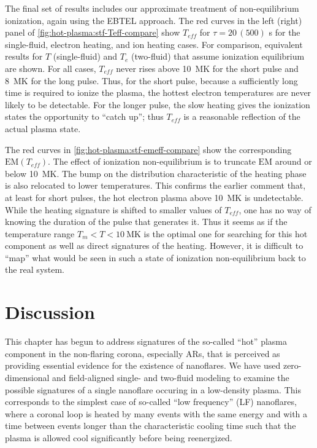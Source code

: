 The final set of results includes our approximate treatment of non-equilibrium ionization, again using the EBTEL approach. The red curves in the left (right) panel of \autoref{fig:hot-plasma:stf-Teff-compare} show $T_{eff}$ for $\tau=20\,(500)$ s for the single-fluid, electron heating, and ion heating cases. For comparison, equivalent results for $T$ (single-fluid) and $T_e$ (two-fluid) that assume ionization equilibrium are shown. For all cases, $T_{eff}$ never rises above \SI{10}{\mega\kelvin} for the short pulse and \SI{8}{\mega\kelvin} for the long pulse. Thus, for the short pulse, because a sufficiently long time is required to ionize the plasma, the hottest electron temperatures are never likely to be detectable. For the longer pulse, the slow heating gives the ionization states the opportunity to ``catch up''; thus $T_{eff}$ is a reasonable reflection of the actual plasma state.

The red curves in \autoref{fig:hot-plasma:stf-emeff-compare} show the corresponding $\mathrm{EM}(T_{eff})$. The effect of ionization non-equilibrium is to truncate  $\mathrm{EM}$ around or below \SI{10}{\mega\kelvin}. The bump on the distribution characteristic of the heating phase is also relocated to lower temperatures. This confirms the earlier comment that, at least for short pulses, the hot electron plasma above \SI{10}{\mega\kelvin} is undetectable. While the heating signature is shifted to smaller values of $T_{eff}$, one has no way of knowing the duration of the pulse that generates it. Thus it seems as if the temperature range $T_m<T<\SI{10}{\mega\kelvin}$ is the optimal one for searching for this hot component as well as direct signatures of the heating. However, it is difficult to ``map'' what would be seen in such a state of ionization non-equilibrium back to the real system.

\section{Discussion}\label{hot-plasma:sec:discussion}

This chapter has begun to address signatures of the so-called ``hot'' plasma component in the non-flaring corona, especially ARs, that is perceived as providing essential evidence for the existence of nanoflares. We have used zero-dimensional and field-aligned single- and two-fluid modeling to examine the possible signatures of a single nanoflare occuring in a low-density plasma. This corresponds to the simplest case of so-called ``low frequency'' (LF) nanoflares, where a coronal loop is heated by many events with the same energy and with a time between events longer than the characteristic cooling time such that the plasma is allowed cool significantly before being reenergized.

